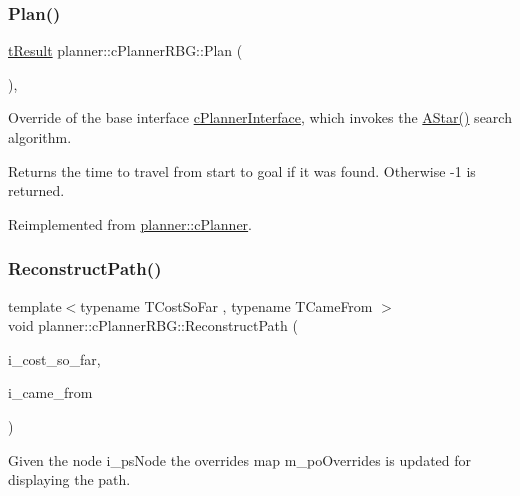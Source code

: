 \subsubsection{\texorpdfstring{Plan()}{Plan()}}
{\footnotesize\ttfamily \mbox{\hyperlink{structt_result}{t\+Result}} planner\+::c\+Planner\+R\+B\+G\+::\+Plan (\begin{DoxyParamCaption}{ }\end{DoxyParamCaption})\hspace{0.3cm}{\ttfamily [override]}, {\ttfamily [virtual]}}



Override of the base interface \mbox{\hyperlink{classplanner_1_1c_planner_interface}{c\+Planner\+Interface}}, which invokes the \mbox{\hyperlink{classplanner_1_1c_planner_r_b_g_affd7011ef4df878a8e95ecf7f42c8e6f}{A\+Star()}} search algorithm. 

\begin{DoxyReturn}{Returns}
the time to travel from start to goal if it was found. Otherwise -\/1 is returned. 
\end{DoxyReturn}


Reimplemented from \mbox{\hyperlink{classplanner_1_1c_planner_a21230c015260b9fc34ad2f239592470e}{planner\+::c\+Planner}}.

\mbox{\label{classplanner_1_1c_planner_r_b_g_a1af74d398b286f1e05e6ade495efbbd0}} 
\subsubsection{\texorpdfstring{Reconstruct\+Path()}{ReconstructPath()}}
{\footnotesize\ttfamily template$<$typename T\+Cost\+So\+Far , typename T\+Came\+From $>$ \\
void planner\+::c\+Planner\+R\+B\+G\+::\+Reconstruct\+Path (\begin{DoxyParamCaption}\item[{T\+Cost\+So\+Far \&\&}]{i\+\_\+cost\+\_\+so\+\_\+far,  }\item[{T\+Came\+From \&\&}]{i\+\_\+came\+\_\+from }\end{DoxyParamCaption})}



Given the node i\+\_\+ps\+Node the overrides map m\+\_\+po\+Overrides is updated for displaying the path. 

